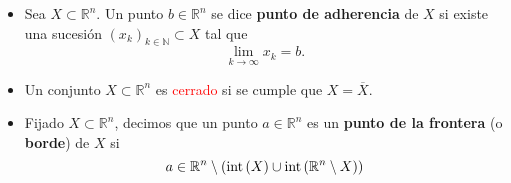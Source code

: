 \begin{itemize}
	\item Sea \( X \subset \mathbb{R}^n \). Un punto \( b \in \mathbb{R}^n \) se dice \textbf{punto de adherencia}  de \( X \) si existe una sucesión \( (x_k)_{k \in \mathbb{N}} \subset X \) tal que
	      \[
		      \lim_{k \to \infty} x_k = b.
	      \]

	\item Un conjunto \( X \subset \mathbb{R}^n \) es \textcolor{red}{cerrado} si se cumple que \( X = \overline{X} \).


	\item Fijado \( X \subset \mathbb{R}^n \), decimos que un punto \( a \in \mathbb{R}^n \) es un  \textbf{punto de la frontera}  (o \textbf{borde}) de \( X \) si
	      \[
		      a \in \mathbb{R}^n \setminus \left( \operatorname{int}\left(X\right) \cup \operatorname{int}\left(\mathbb{R}^n \setminus X\right) \right)
	      \]


\end{itemize}

